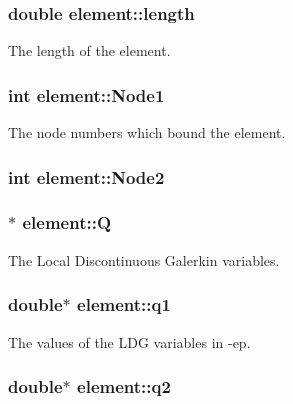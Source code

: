 \subsubsection[{length}]{\setlength{\rightskip}{0pt plus 5cm}double element\-::length}\label{classelement_a06670ef1299084fc645fc1441ee9fe62}


The length of the element. 

\subsubsection[{Node1}]{\setlength{\rightskip}{0pt plus 5cm}int element\-::\-Node1}\label{classelement_a39288677ba181a95c92cdb269947cfac}


The node numbers which bound the element. 

\subsubsection[{Node2}]{\setlength{\rightskip}{0pt plus 5cm}int element\-::\-Node2}\label{classelement_a30ebcc5c6f8e8a4ab3f960da1ec410d1}
\subsubsection[{Q}]{$\ast$ element\-::\-Q}\label{classelement_aa83f5142f575c2bc3504cf25e8749ab6}


The Local Discontinuous Galerkin variables. 

\subsubsection[{q1}]{\setlength{\rightskip}{0pt plus 5cm}double$\ast$ element\-::q1}\label{classelement_afee2741280acb7f07e4d97e3d319f85b}


The values of the L\-D\-G variables in -\/ep. 

\subsubsection[{q2}]{\setlength{\rightskip}{0pt plus 5cm}double$\ast$ element\-::q2}\label{classelement_afc7fe8e8ea7c9152dbf462a8a4d165af}


